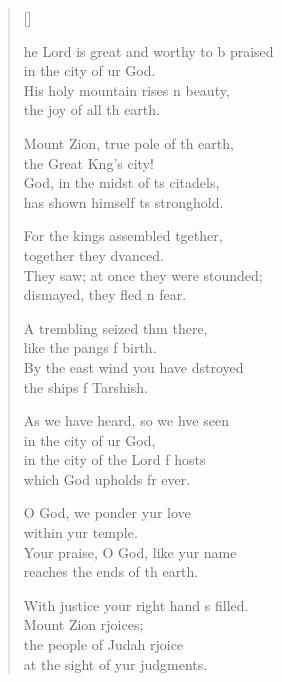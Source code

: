 \settowidth{\versewidth}{The Lord is great and worthy to be praised *}
\begin{verse}[\versewidth]
  \begin{patverse}
    he Lord is great and worthy to b praised\Med\\
in the city of ur God.\\
His holy mountain rises \pointup{\i}n beauty,\Med\\
the joy of all th earth.

Mount Zion, true pole of th earth,\Med\\
the Great K\pointup{\i}ng’s city!\\
God, in the midst of \pointup{\i}ts citadels,\Med\\
has shown himself \pointup{\i}ts stronghold.

For the kings assembled tgether,\Med\\
together they dvanced.\\
They saw; at once they were stounded;\Med\\
dismayed, they fled \pointup{\i}n fear.

A trembling seized thm there,\Med\\
like the pangs f birth.\\
By the east wind you have dstroyed\Med\\
the ships f Tarshish.

As we have heard, so we hve seen\Med\\
in the city of ur God,\\
in the city of the Lord f hosts\Med\\
which God upholds fr ever.

O God, we ponder yur love\Med\\
within yur temple.\\
Your praise, O God, like yur name\Med\\
reaches the ends of th earth.

With justice your right hand \pointup{\i}s filled.\Med\\
Mount Zion rjoices;\\
the people of Judah rjoice\Med\\
at the sight of yur judgments.


\end{patverse}
\end{verse}
